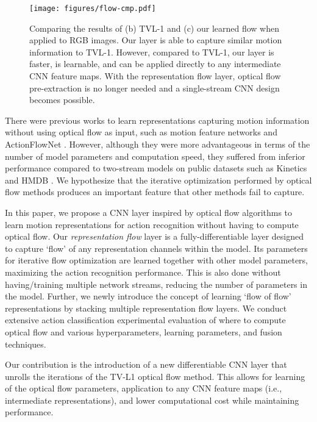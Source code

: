 \documentclass[10pt,twocolumn,letterpaper]{article}
\begin{document}
\begin{figure}
    \centering
    \texttt{[image: figures/flow-cmp.pdf]}
    \caption{Comparing the results of (b) TVL-1 and (c) our learned flow when applied to RGB images. Our layer is able to capture similar motion information to TVL-1. However, compared to TVL-1, our layer is faster, is learnable, and can be applied directly to any intermediate CNN feature maps. With the representation flow layer, optical flow pre-extraction is no longer needed and a single-stream CNN design becomes possible.}
    \label{fig:flow-comapre}
\end{figure}


There were previous works to learn representations capturing motion information without using optical flow as input, such as motion feature networks \cite{lee2018motion} and ActionFlowNet \cite{ng2018actionflownet}. However, although they were more advantageous in terms of the number of model parameters and computation speed, they suffered from inferior performance compared to two-stream models on public datasets such as Kinetics \cite{kay2017kinetics} and HMDB \cite{hmdb}. We hypothesize that the iterative optimization performed by optical flow methods produces an important feature that other methods fail to capture.

In this paper, we propose a CNN layer inspired by optical flow algorithms to learn motion representations for action recognition without having to compute optical flow.
Our \emph{representation flow} layer is a fully-differentiable layer designed to capture `flow' of any representation channels within the model.
Its parameters for iterative flow optimization are learned together with other model parameters, maximizing the action recognition performance.
This is also done without having/training multiple network streams, reducing the number of parameters in the model.
Further, we newly introduce the concept of learning `flow of flow' representations by stacking multiple representation flow layers.
We conduct extensive action classification experimental evaluation of where to compute optical flow and various hyperparameters, learning parameters, and fusion techniques.

Our contribution is the introduction of a new differentiable CNN layer that unrolls the iterations of the TV-L1 optical flow method. This allows for learning of the optical flow parameters, application to any CNN feature maps (i.e., intermediate representations), and lower computational cost while maintaining performance.
\end{document}
